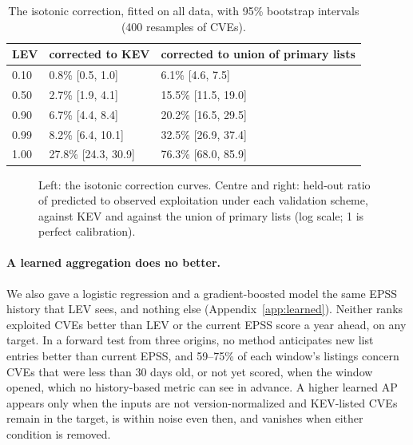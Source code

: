\begin{table}[t]
\centering\small
\caption{The isotonic correction, fitted on all data, with 95\% bootstrap
intervals (400 resamples of CVEs).}\label{tab:curve}
\begin{tabular}{@{}lll@{}}
\toprule
LEV & corrected to KEV & corrected to union of primary lists \\
\midrule
0.10 & 0.8\% [0.5, 1.0] & 6.1\% [4.6, 7.5] \\
0.50 & 2.7\% [1.9, 4.1] & 15.5\% [11.5, 19.0] \\
0.90 & 6.7\% [4.4, 8.4] & 20.2\% [16.5, 29.5] \\
0.99 & 8.2\% [6.4, 10.1] & 32.5\% [26.9, 37.4] \\
1.00 & 27.8\% [24.3, 30.9] & 76.3\% [68.0, 85.9] \\
\bottomrule
\end{tabular}
\end{table}

\begin{figure}[t]
\centering
{}
\caption{Left: the isotonic correction curves. Centre and right: held-out ratio
of predicted to observed exploitation under each validation scheme, against KEV
and against the union of primary lists (log scale; 1 is perfect
calibration).}\label{fig:recal}
\end{figure}

\paragraph{A learned aggregation does no better.} We also gave a logistic
regression and a gradient-boosted model the same EPSS history that LEV sees,
and nothing else (Appendix~\ref{app:learned}). Neither ranks exploited CVEs
better than LEV or the current EPSS score a year ahead, on any target. In a
forward test from three origins, no method anticipates new list entries better
than current EPSS, and 59--75\% of each window's listings concern CVEs that
were less than 30 days old, or not yet scored, when the window opened, which
no history-based metric can see in advance. A higher learned AP appears only when the inputs are not
version-normalized and KEV-listed CVEs remain in the target, is within noise
even then, and vanishes when either condition is removed.


